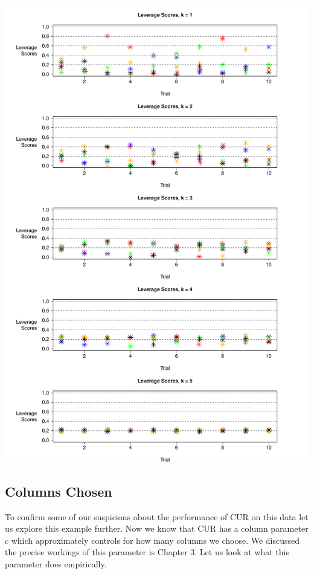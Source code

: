 \documentclass{book}
\begin{document}
\begin{center}
\includegraphics[scale=.60]{./Figures/levs4.pdf}%
\end{center}
\pagebreak

\subsection{Columns Chosen}
To confirm some of our suspicions about the performance of CUR on this data let us explore this example further. Now we know that CUR has a column parameter $c$ which approximately controls for how many columns we choose. We discussed the precise workings of this parameter is Chapter 3. Let us look at what this parameter does empirically. 
\end{document}
